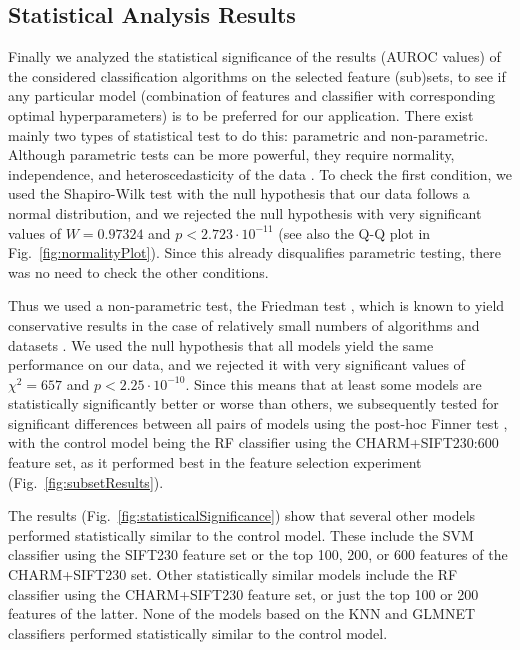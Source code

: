 \subsection{Statistical Analysis Results}
\label{subsec:experimentalAnalysis}

Finally we analyzed the statistical significance of the results (AUROC values) of the considered classification algorithms on the selected feature (sub)sets, to see if any particular model (combination of features and classifier with corresponding optimal hyperparameters) is to be preferred for our application. There exist mainly two types of statistical test to do this: parametric and non-parametric. Although parametric tests can be more powerful, they require normality, independence, and heteroscedasticity of the data \citep{10.7717/peerj.2721}. To check the first condition, we used the Shapiro-Wilk test \citep{Shapiro-Wilk-1965} with the null hypothesis that our data follows a normal distribution, and we rejected the null hypothesis with very significant values of {\color{red}$W = 0.97324$ and $p < 2.723 \cdot 10^{-11}$} (see also the Q-Q plot in Fig.~\ref{fig:normalityPlot}). Since this already disqualifies parametric testing, there was no need to check the other conditions.

Thus we used a non-parametric test, the Friedman test \citep{Friedman-1940}, which is known to yield conservative results in the case of relatively small numbers of algorithms and datasets \citep{Garcia-2010}. We used the null hypothesis that all models yield the same performance on our data, and we rejected it with very significant values of {\color{red}$\chi^2 = 657$ and $p < 2.25 \cdot 10^{-10}$}. Since this means that at least some models are statistically significantly better or worse than others, we subsequently tested for significant differences between all pairs of models using the post-hoc {\color{red}Finner test \citep{Finner1993}, with the control model being the RF classifier using the CHARM+SIFT230:600 feature set, as it performed best in the feature selection experiment (Fig.~\ref{fig:subsetResults})}.

The results (Fig.~\ref{fig:statisticalSignificance}) show that several other models performed statistically similar to the control model. {\color{red}These include the SVM classifier using the SIFT230 feature set or the top 100, 200, or 600 features of the CHARM+SIFT230 set. Other statistically similar models include the RF classifier using the CHARM+SIFT230 feature set, or just the top 100 or 200 features of the latter. None of the models based on the KNN and GLMNET classifiers performed statistically similar to the control model.}

